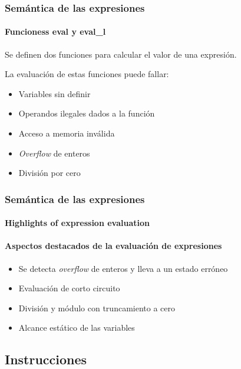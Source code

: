 \begin{frame}
\frametitle{Semántica de las expresiones}
\framesubtitle{Funcioness eval y eval\_l}

Se definen dos funciones para calcular el valor de una expresión.

\bigskip

La evaluación de estas funciones puede fallar:

\bigskip
\pause

\begin{itemize}
\item{Variables sin definir}
\pause
\item{Operandos ilegales dados a la función}
\pause
\item{Acceso a memoria inválida}
\pause
\item{\textit{Overflow} de enteros}
\pause
\item{División por cero}
\end{itemize}


\end{frame}


\begin{frame}
\frametitle{Semántica de las expresiones}
\framesubtitle{Highlights of expression evaluation}
\framesubtitle{Aspectos destacados de la evaluación de expresiones}

\begin{itemize}
\item{Se detecta \textit{overflow} de enteros y lleva a un estado erróneo}
\item{Evaluación de corto circuito}
\item{División y módulo con truncamiento a cero}
\item{Alcance estático de las variables}
\end{itemize}


\end{frame}


\subsection{Instrucciones}


\begin{comment}
\begin{frame}[fragile]
\frametitle{Syntax of commands}
\framesubtitle{Concrete syntax}

\begin{semiverbatim}
com ::= SKIP
     | lexp ::== exp
     | vname ::= exp
     | com ;; com
     | IF exp THEN com ELSE com
     | WHILE exp DO com
     | FREE lexp
     | RETURN exp
     | RETURNV
     | lexp ::== f ( [exp] )
     | vname ::= f ( [exp] )
     | CALL f ( [exp])
\end{semiverbatim}


\end{frame}
\end{comment}


